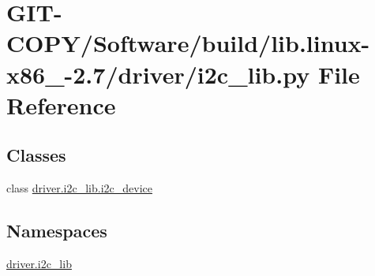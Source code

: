 \hypertarget{GIT-COPY_2Software_2build_2lib_8linux-x86__64-2_87_2driver_2i2c__lib_8py}{}\section{G\+I\+T-\/\+C\+O\+P\+Y/\+Software/build/lib.linux-\/x86\+\_-\/2.7/driver/i2c\+\_\+lib.py File Reference}
\label{GIT-COPY_2Software_2build_2lib_8linux-x86__64-2_87_2driver_2i2c__lib_8py}
\subsection*{Classes}
\begin{DoxyCompactItemize}
\item 
class \hyperlink{classdriver_1_1i2c__lib_1_1i2c__device}{driver.\+i2c\+\_\+lib.\+i2c\+\_\+device}
\end{DoxyCompactItemize}
\subsection*{Namespaces}
\begin{DoxyCompactItemize}
\item 
 \hyperlink{namespacedriver_1_1i2c__lib}{driver.\+i2c\+\_\+lib}
\end{DoxyCompactItemize}
